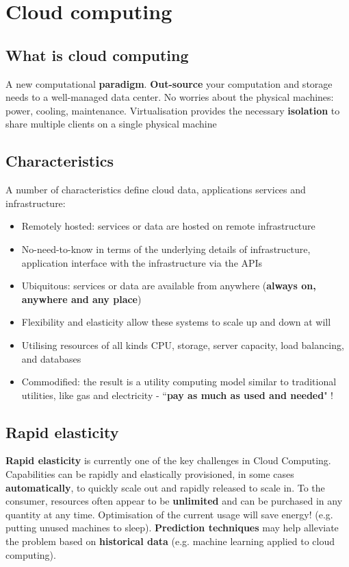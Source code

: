 \documentclass{article}
\begin{document}
\section{Cloud computing}
\subsection{What is cloud computing}
\begin{flushleft}
A new computational \textbf{paradigm}. \textbf{Out-source} your computation and storage needs to a well-managed data center. No worries about the physical machines: power, cooling, maintenance. Virtualisation provides the necessary \textbf{isolation} to share multiple clients on a single physical machine
\end{flushleft}

\subsection{Characteristics}
\begin{flushleft}
A number of characteristics define cloud data, applications services and infrastructure: 
\begin{itemize}
	\item Remotely hosted: services or data are hosted on remote infrastructure
	\item No-need-to-know in terms of the underlying details of infrastructure, application interface with the infrastructure via the APIs
	\item Ubiquitous: services or data are available from anywhere (\textbf{always on, anywhere and any place})
	\item Flexibility and elasticity allow these systems to scale up and down at will
	\item Utilising resources of all kinds CPU, storage, server capacity, load balancing, and databases
	\item Commodified: the result is a utility computing model similar to traditional utilities, like gas and electricity - “\textbf{pay as much as used and needed}" !
\end{itemize}
\end{flushleft}

\subsection{Rapid elasticity}
\begin{flushleft}
\textbf{Rapid elasticity} is currently one of the key challenges in Cloud Computing. Capabilities can be rapidly and elastically provisioned, in some cases \textbf{automatically}, to quickly scale out and rapidly released to scale in. To the consumer, resources often appear to be \textbf{unlimited} and can be purchased in any quantity at any time. Optimisation of the current usage will save energy! (e.g. putting unused machines to sleep). \textbf{Prediction techniques} may help alleviate the problem based on \textbf{historical data} (e.g. machine learning applied to cloud computing).
\end{flushleft}
\end{document}
